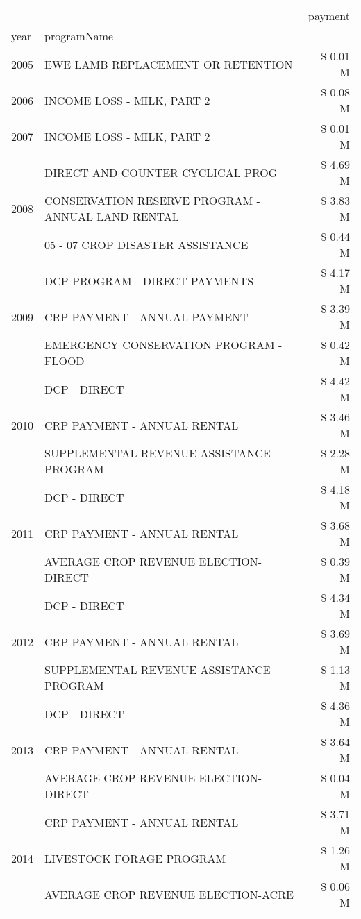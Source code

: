 \begin{tabular}{llr}
\toprule
 &  & payment \\
year & programName &  \\
\midrule
2005 & EWE LAMB REPLACEMENT OR RETENTION & \$ 0.01 M \\
\cline{1-3}
2006 & INCOME LOSS - MILK, PART 2 & \$ 0.08 M \\
\cline{1-3}
2007 & INCOME LOSS - MILK, PART 2 & \$ 0.01 M \\
\cline{1-3}
\multirow[t]{3}{*}{2008} & DIRECT AND COUNTER CYCLICAL PROG & \$ 4.69 M \\
 & CONSERVATION RESERVE PROGRAM - ANNUAL LAND RENTAL & \$ 3.83 M \\
 & 05 - 07 CROP DISASTER ASSISTANCE & \$ 0.44 M \\
\cline{1-3}
\multirow[t]{3}{*}{2009} & DCP PROGRAM - DIRECT PAYMENTS & \$ 4.17 M \\
 & CRP PAYMENT - ANNUAL PAYMENT & \$ 3.39 M \\
 & EMERGENCY CONSERVATION PROGRAM - FLOOD & \$ 0.42 M \\
\cline{1-3}
\multirow[t]{3}{*}{2010} & DCP - DIRECT & \$ 4.42 M \\
 & CRP PAYMENT - ANNUAL RENTAL & \$ 3.46 M \\
 & SUPPLEMENTAL REVENUE ASSISTANCE PROGRAM & \$ 2.28 M \\
\cline{1-3}
\multirow[t]{3}{*}{2011} & DCP - DIRECT & \$ 4.18 M \\
 & CRP PAYMENT - ANNUAL RENTAL & \$ 3.68 M \\
 & AVERAGE CROP REVENUE ELECTION-DIRECT & \$ 0.39 M \\
\cline{1-3}
\multirow[t]{3}{*}{2012} & DCP - DIRECT & \$ 4.34 M \\
 & CRP PAYMENT - ANNUAL RENTAL & \$ 3.69 M \\
 & SUPPLEMENTAL REVENUE ASSISTANCE PROGRAM & \$ 1.13 M \\
\cline{1-3}
\multirow[t]{3}{*}{2013} & DCP - DIRECT & \$ 4.36 M \\
 & CRP PAYMENT - ANNUAL RENTAL & \$ 3.64 M \\
 & AVERAGE CROP REVENUE ELECTION-DIRECT & \$ 0.04 M \\
\cline{1-3}
\multirow[t]{3}{*}{2014} & CRP PAYMENT - ANNUAL RENTAL & \$ 3.71 M \\
 & LIVESTOCK FORAGE PROGRAM & \$ 1.26 M \\
 & AVERAGE CROP REVENUE ELECTION-ACRE & \$ 0.06 M \\
\cline{1-3}

\end{tabular}

